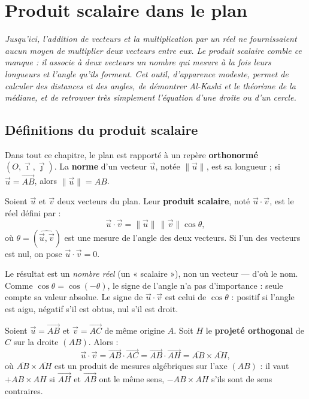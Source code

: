 \chapter{Produit scalaire dans le plan}
\textit{Jusqu'ici, l'addition de vecteurs et la multiplication par un réel ne
fournissaient aucun moyen de \emph{multiplier} deux vecteurs entre eux. Le produit
scalaire comble ce manque : il associe à deux vecteurs un \emph{nombre} qui mesure à
la fois leurs longueurs et l'angle qu'ils forment. Cet outil, d'apparence modeste,
permet de calculer des distances et des angles, de démontrer Al-Kashi et le théorème
de la médiane, et de retrouver très simplement l'équation d'une droite ou d'un cercle.}

\section{Définitions du produit scalaire}

Dans tout ce chapitre, le plan est rapporté à un repère \textbf{orthonormé}
$(O,\vec{\imath},\vec{\jmath})$. La \textbf{norme} d'un vecteur $\vec{u}$, notée
$\|\vec{u}\|$, est sa longueur ; si $\vec{u}=\vec{AB}$, alors $\|\vec{u}\|=AB$.

\begin{definition}
Soient $\vec{u}$ et $\vec{v}$ deux vecteurs du plan. Leur \textbf{produit scalaire},
noté $\vec{u}\cdot\vec{v}$, est le réel défini par :
\[ \vec{u}\cdot\vec{v}=\|\vec{u}\|\,\|\vec{v}\|\cos\theta, \]
où $\theta=(\widehat{\vec{u},\vec{v}})$ est une mesure de l'angle des deux vecteurs.
Si l'un des vecteurs est nul, on pose $\vec{u}\cdot\vec{v}=0$.
\end{definition}

\begin{remarque}
Le résultat est un \emph{nombre réel} (un « scalaire »), non un vecteur — d'où le nom.
Comme $\cos\theta=\cos(-\theta)$, le signe de l'angle n'a pas d'importance : seule
compte sa valeur absolue. Le signe de $\vec{u}\cdot\vec{v}$ est celui de $\cos\theta$ :
positif si l'angle est aigu, négatif s'il est obtus, nul s'il est droit.
\end{remarque}

\begin{definition}
Soient $\vec{u}=\vec{AB}$ et $\vec{v}=\vec{AC}$ de même origine $A$. Soit $H$ le
\textbf{projeté orthogonal} de $C$ sur la droite $(AB)$. Alors :
\[ \vec{u}\cdot\vec{v}=\vec{AB}\cdot\vec{AC}=\vec{AB}\cdot\vec{AH}=
   \overline{AB}\times\overline{AH}, \]
où $\overline{AB}\times\overline{AH}$ est un produit de mesures algébriques sur l'axe
$(AB)$ : il vaut $+AB\times AH$ si $\vec{AH}$ et $\vec{AB}$ ont le même sens,
$-AB\times AH$ s'ils sont de sens contraires.
\end{definition}


